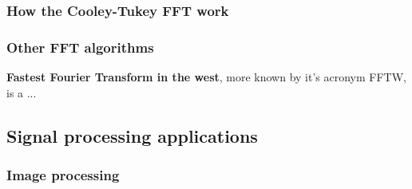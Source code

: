 



\subsubsection{How the Cooley-Tukey FFT work}
\subsubsection{Other FFT algorithms}
\textbf{Fastest Fourier Transform in the west}, more known by it's acronym FFTW, is a ...

\subsection{Signal processing applications}

\subsubsection{Image processing}





